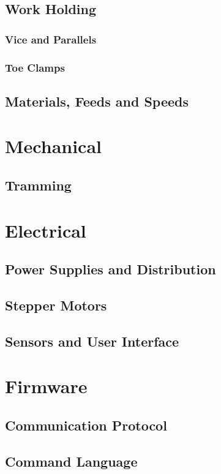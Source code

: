 \documentclass[a4paper,11pt]{article}
\begin{document}
\subsection{Work Holding}
\subsubsection{Vice and Parallels}
\subsubsection{Toe Clamps}

\subsection{Materials, Feeds and Speeds}


\section{Mechanical}
\subsection{Tramming}

\section{Electrical}
\subsection{Power Supplies and Distribution}
\subsection{Stepper Motors}
\subsection{Sensors and User Interface}


\section{Firmware}
\subsection{Communication Protocol}
\subsection{Command Language}
\end{document}
